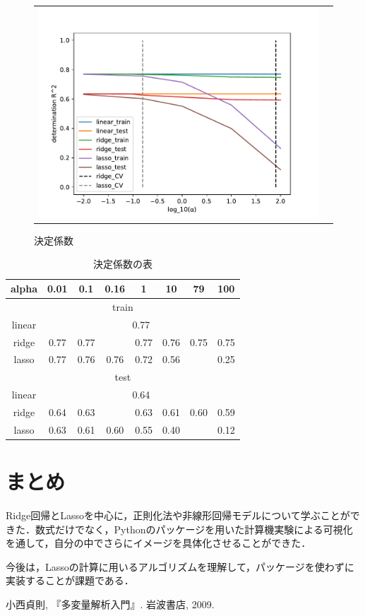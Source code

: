 \documentclass[a4paper,twocolumn]{ujarticle} %
\begin{document}
\begin{figure}[H]
    \begin{tabular}{cc}
	  \begin{minipage}{0.5\hsize}
                	\includegraphics[width=1.0\linewidth]{../img/score.pdf}
                	\caption{決定係数}
               	\label{fig:score}
    	 \end{minipage}
    \end{tabular}
\end{figure}
\begin{table}[H]
	\caption{決定係数の表}
        	\begin{tabular}{|c|c|c|c|c|c|c|c|}
		\hline
        		alpha & 0.01 & 0.1 &0.16 & 1 & 10 & 79 & 100\\ 
		\hline
		\hline
		\multicolumn{8}{|c|}{train} \\
		\hline
		linear & \multicolumn{7}{|c|}{0.77} \\
		\hline
		ridge & 0.77 & 0.77 & & 0.77 & 0.76 & 0.75 & 0.75\\
		\hline
		lasso & 0.77 & 0.76 & 0.76 &0.72 & 0.56 & & 0.25\\
		\hline
		\hline
		\multicolumn{8}{|c|}{test} \\
		\hline
		linear & \multicolumn{7}{|c|}{0.64} \\
		\hline
		ridge & 0.64 & 0.63 & & 0.63 & 0.61 & 0.60 & 0.59\\
		\hline
		lasso & 0.63 & 0.61 & 0.60 &0.55 & 0.40 & & 0.12\\
		\hline
        	\end{tabular}
	\label{tab:score}
\end{table}
\section{まとめ}
Ridge回帰とLassoを中心に，正則化法や非線形回帰モデルについて学ぶことができた．数式だけでなく，Pythonのパッケージを用いた計算機実験による可視化を通して，自分の中でさらにイメージを具体化させることができた．

今後は，Lassoの計算に用いるアルゴリズムを理解して，パッケージを使わずに実装することが課題である．
\begin{thebibliography}{9}
 小西貞則, 『多変量解析入門』. 岩波書店, 2009.
\end{thebibliography}
\end{document}
